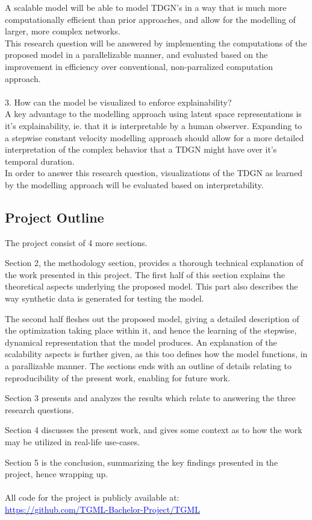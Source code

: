A scalable model will be able to model TDGN's in a way that is much more computationally efficient than prior approaches, and allow for the modelling of larger, more complex networks.
\\
This research question will be answered by implementing the computations of the proposed model in a parallelizable manner, and evaluated based on the improvement in efficiency over conventional, non-parralized computation approach.
\\\\
\hspace*{5mm} 3. How can the model be visualized to enforce explainability?
\\
A key advantage to the modelling approach using latent space representations is it's explainability, ie. that it is interpretable by a human observer.
Expanding to a stepwise constant velocity modelling approach should allow for a more detailed interpretation of the complex behavior that a TDGN might have over it's temporal duration.
\\
In order to answer this research question, visualizations of the TDGN as learned by the modelling approach will be evaluated based on interpretability. 



\subsection{Project Outline}
\label{sec:Intro:ThesisOutline}
The project consist of 4 more sections.

Section 2, the methodology section, provides a thorough technical explanation of the work presented in this project.
The first half of this section explains the theoretical aspects underlying the proposed model.
This part also describes the way synthetic data is generated for testing the model.


The second half fleshes out the proposed model, giving a detailed description of the optimization taking place within it, and hence the learning of the stepwise, dynamical representation that the model produces.
An explanation of the scalability aspects is further given, as this too defines how the model functions, in a parallizable manner.
The sections ends with an outline of details relating to reproducibility of the present work, enabling for future work.

Section 3 presents and analyzes the results which relate to answering the three research questions.

Section 4 discusses the present work, and gives some context as to how the work may be utilized in real-life use-cases.

Section 5 is the conclusion, summarizing the key findings presented in the project, hence wrapping up.
\\\\
All code for the project is publicly available at:
\\
\href{https://github.com/TGML-Bachelor-Project/TGML}{\textcolor{blue}{https://github.com/TGML-Bachelor-Project/TGML}}





